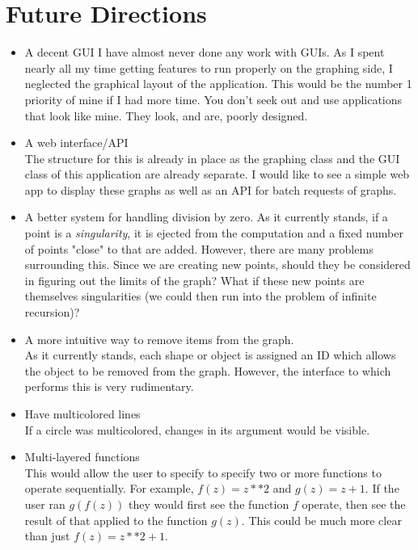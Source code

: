 \documentclass{article}
\begin{document}
\section{Future Directions}
    \begin{itemize}
        \item A decent GUI
            I have almost never done any work with GUIs. As I spent nearly all my time getting features to run properly on the graphing side, I neglected the graphical layout of the application. This would be the number 1 priority of mine if I had more time. You don't seek out and use applications that look like mine. They look, and are, poorly designed.
        \item A web interface/API\\
            The structure for this is already in place as the graphing class and the GUI class of this application are already separate. I would like to see a simple web app to display these graphs as well as an API for batch requests of graphs.
        \item A better system for handling division by zero.
            As it currently stands, if a point is a \textit{singularity}, it is ejected from the computation and a fixed number of points "close" to that are added. However, there are many problems surrounding this. Since we are creating new points, should they be considered in figuring out the limits of the graph? What if these new points are themselves singularities (we could then run into the problem of infinite recursion)?
        \item A more intuitive way to remove items from the graph.\\
            As it currently stands, each shape or object is assigned an ID which allows the object to be removed from the graph. However, the interface to which performs this is very rudimentary.
        \item Have multicolored lines\\
            If a circle was multicolored, changes in its argument would be visible.
        \item Multi-layered functions\\
            This would allow the user to specify to specify two or more functions to operate sequentially. For example, $f(z) = z**2$ and $g(z) = z + 1$. If the user ran $g(f(z))$ they would first see the function $f$ operate, then see the result of that applied to the function $g(z)$. This could be much more clear than just $f(z) = z**2 + 1$.
    \end{itemize}
\end{document}
